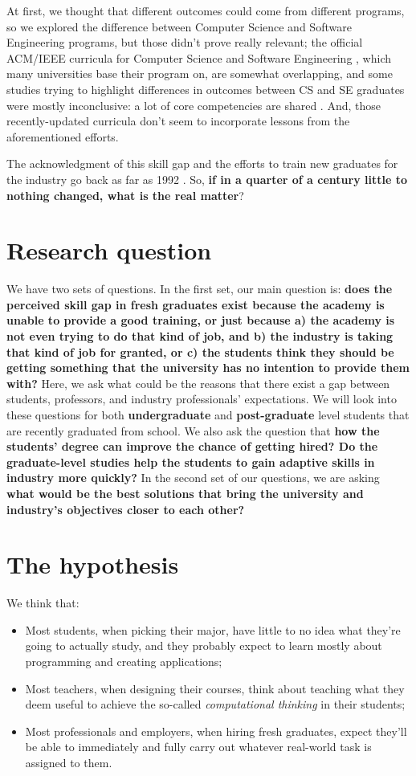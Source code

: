 \documentclass{sigchi}
\begin{document}
At first, we thought that different outcomes could come from different programs, so we explored the difference between Computer Science and Software Engineering programs, but those didn't prove really relevant; the official ACM/IEEE curricula for Computer Science \cite{Force2013} and Software Engineering \cite{Ardis2015}, which many universities base their program on, are somewhat overlapping, and some studies trying to highlight differences in outcomes between CS and SE graduates were mostly inconclusive: a lot of core competencies are shared \cite{Meziane2004} \cite{Rasool2014}. And, those recently-updated curricula don't seem to incorporate lessons from the aforementioned efforts.

The acknowledgment of this skill gap and the efforts to train new graduates for the industry go back as far as 1992 \cite{Dawson1992}. So, \textbf{if in a quarter of a century little to nothing changed, what is the real matter}?

\section{Research question}
We have two sets of questions. In the first set, our main question is: \textbf{does the perceived skill gap in fresh graduates exist because the academy is unable to provide a good training, or just because a) the academy is not even trying to do that kind of job, and b) the industry is taking that kind of job for granted, or c) the students think they should be getting something that the university has no intention to provide them with?} Here, we ask what could be the reasons that there exist a gap between students, professors, and industry professionals' expectations. We will look into these questions for both \textbf{undergraduate} and \textbf{post-graduate} level students that are recently graduated from school. We also ask the question that \textbf{how the students' degree can improve the chance of getting hired? Do the graduate-level studies help the students to gain adaptive skills in industry more quickly?}\newline
In the second set of our questions, we are asking \textbf{what would be the best solutions that bring the university and industry's objectives closer to each other?} 

\section{The hypothesis}
We think that:
\begin{itemize}
\item Most students, when picking their major, have little to no idea what they're going to actually study, and they probably expect to learn mostly about programming and creating applications;
\item Most teachers, when designing their courses, think about teaching what they deem useful to achieve the so-called \textit{computational thinking} in their students;
\item Most professionals and employers, when hiring fresh graduates, expect they'll be able to immediately and fully carry out whatever real-world task is assigned to them.
\end{itemize}
\end{document}
